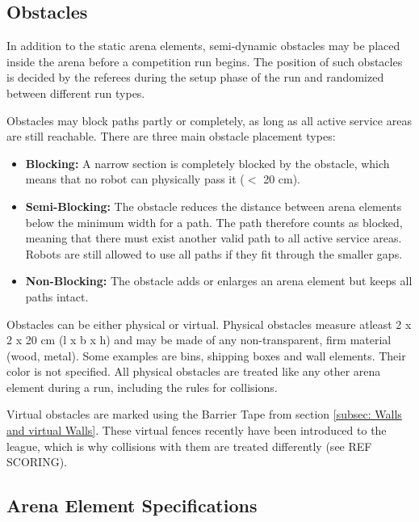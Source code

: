 
\subsection{Obstacles}
\label{subsec: Obstacles}

In addition to the static arena elements, semi-dynamic obstacles may be placed inside the arena before a competition run begins. 
The position of such obstacles is decided by the referees during the setup phase of the run and randomized between different run types.

Obstacles may block paths partly or completely, as long as all active service areas are still reachable.
There are three main obstacle placement types:

\begin{itemize}
\item \textbf{Blocking:} 
A narrow section is completely blocked by the obstacle, which means that no robot can physically pass it ($<$ 20 cm).

\item \textbf{Semi-Blocking:} 
The obstacle reduces the distance between arena elements below the minimum width for a path. The path therefore counts as blocked, meaning that there must exist another valid path to all active service areas. Robots are still allowed to use all paths if they fit through the smaller gaps.

\item \textbf{Non-Blocking:}
The obstacle adds or enlarges an arena element but keeps all paths intact.
\end{itemize}

Obstacles can be either physical or virtual.
Physical obstacles measure atleast 2 x 2 x 20 cm (l x b x h) and may be made of any non-transparent, firm material (wood, metal). Some examples are bins, shipping boxes and wall elements. Their color is not specified.
All physical obstacles are treated like any other arena element during a run, including the rules for collisions.

Virtual obstacles are marked using the Barrier Tape from section \ref{subsec: Walls and virtual Walls}. 
These virtual fences recently have been introduced to the league, which is why collisions with them are treated differently (see REF SCORING).

\subsection{Arena Element Specifications}
\label{subsec: Arena Element Specifications}

